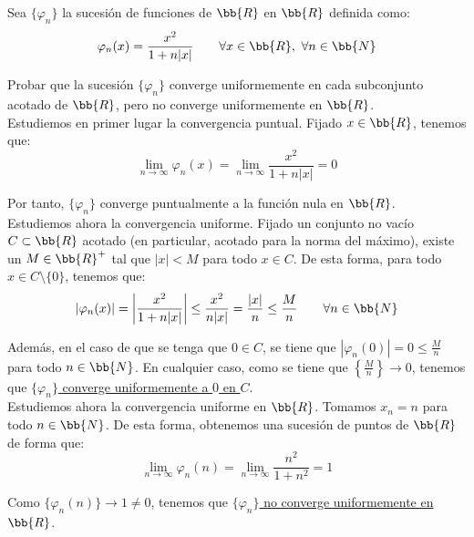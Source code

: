 \begin{ejercicio}
    Sea $\{\varphi_n\}$ la sucesión de funciones de $\bb{R}$ en $\bb{R}$ definida como:
    \begin{equation*}
        \varphi_n(x) = \frac{x^2}{1+n|x|} \qquad \forall x\in \bb{R},~\forall n\in \bb{N}
    \end{equation*}

    Probar que la sucesión $\{\varphi_n\}$ converge uniformemente en cada subconjunto acotado de $\bb{R}$, pero no converge uniformemente en $\bb{R}$.\\

    Estudiemos en primer lugar la convergencia puntual. Fijado $x\in \bb{R}$, tenemos que:
    \begin{equation*}
        \lim_{n\to \infty} \varphi_n(x) = \lim_{n\to \infty} \frac{x^2}{1+n|x|} = 0
    \end{equation*}

    Por tanto, $\{\varphi_n\}$ converge puntualmente a la función nula en $\bb{R}$.\\

    Estudiemos ahora la convergencia uniforme. Fijado un conjunto no vacío $C\subset \bb{R}$ acotado (en particular, acotado para la norma del máximo), existe un $M\in \bb{R}^+$ tal que $|x|<M$ para todo $x\in C$. De esta forma, para todo $x\in C\setminus \{0\}$, tenemos que:
    \begin{equation*}
        |\varphi_n(x)| = \left|\frac{x^2}{1+n|x|}\right| \leq \frac{x^2}{n|x|} = \frac{|x|}{n} \leq \frac{M}{n} \qquad \forall n\in \bb{N}
    \end{equation*}

    Además, en el caso de que se tenga que $0\in C$, se tiene que $|\varphi_n(0)|=0 \leq \frac{M}{n}$ para todo $n\in \bb{N}$.
    En cualquier caso, como se tiene que $\left\{\frac{M}{n}\right\}\to 0$, tenemos que \ul{$\{\varphi_n\}$ converge uniformemente a $0$ en $C$}.\\

    Estudiemos ahora la convergencia uniforme en $\bb{R}$. Tomamos $x_n=n$ para todo $n\in \bb{N}$. De esta forma, obtenemos una sucesión de puntos de $\bb{R}$ de forma que:
    \begin{equation*}
        \lim_{n\to \infty} \varphi_n(n) = \lim_{n\to \infty} \frac{n^2}{1+n^2} = 1
    \end{equation*}

    Como $\{\varphi_n(n)\}\to 1\neq 0$, tenemos que \ul{$\{\varphi_n\}$ no converge uniformemente en $\bb{R}$}.
\end{ejercicio}


